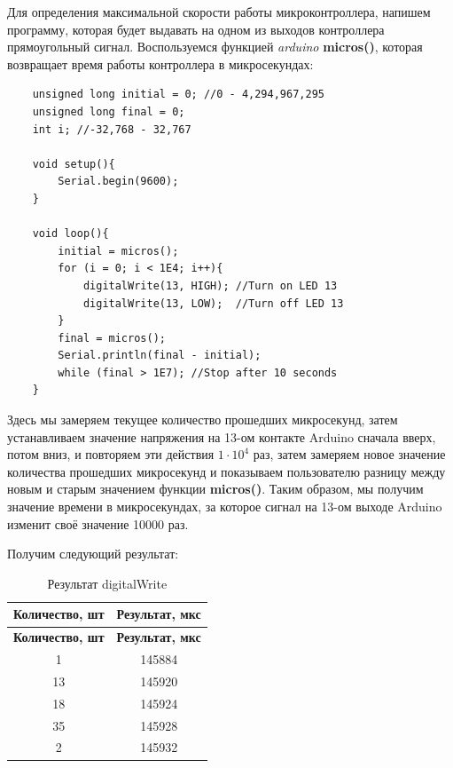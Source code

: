 Для определения максимальной скорости работы микроконтроллера, напишем программу, которая будет выдавать на одном из выходов контроллера прямоугольный сигнал. Воспользуемся функцией \textit{arduino} \textbf{micros()}, которая возвращает время работы контроллера в микросекундах:

\begin{verbatim}
    unsigned long initial = 0; //0 - 4,294,967,295
    unsigned long final = 0;
    int i; //-32,768 - 32,767

    void setup(){
        Serial.begin(9600);
    }

    void loop(){
        initial = micros();
        for (i = 0; i < 1E4; i++){
            digitalWrite(13, HIGH); //Turn on LED 13
            digitalWrite(13, LOW);  //Turn off LED 13
        }
        final = micros();
        Serial.println(final - initial);
        while (final > 1E7); //Stop after 10 seconds
    }
\end{verbatim}

Здесь мы замеряем текущее количество прошедших микросекунд, затем устанавливаем значение напряжения на 13-ом контакте Arduino сначала вверх, потом вниз, и повторяем эти действия $1 \cdot 10^4$ раз, затем замеряем новое значение количества прошедших микросекунд и показываем пользователю разницу между новым и старым значением функции \textbf{micros()}. Таким образом, мы получим значение времени в микросекундах, за которое сигнал на 13-ом выходе Arduino изменит своё значение 10000 раз.

Получим следующий результат:

\begin{longtable}[c]{|c|c|}
    \caption{Результат digitalWrite}
    \label{digitalWriteResult}\\
    \hline
    \textbf{Количество, шт} & \textbf{Результат, мкс}\\
    \hline
    \endfirsthead
    \hline
    \textbf{Количество, шт} & \textbf{Результат, мкс}\\
    \hline
    \endhead
        1 & 145884\\
        \hline
        13 & 145920\\
        \hline
        18 & 145924\\
        \hline
        35 & 145928\\
        \hline
        2 & 145932\\
        \hline
\end{longtable}

